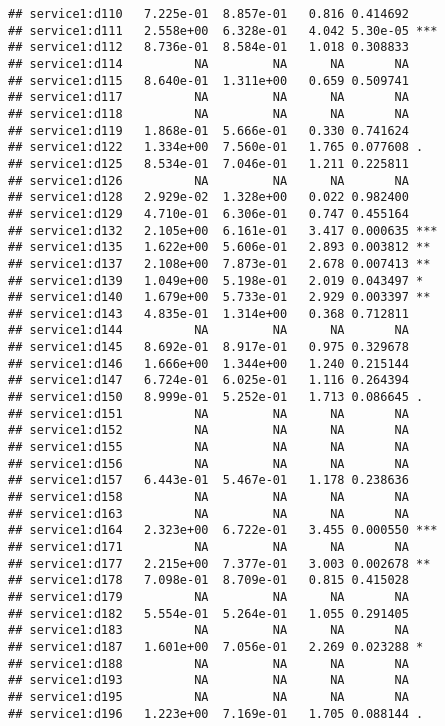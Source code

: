 \documentclass[
]{article}
\begin{document}
\begin{verbatim}
## service1:d110   7.225e-01  8.857e-01   0.816 0.414692    
## service1:d111   2.558e+00  6.328e-01   4.042 5.30e-05 ***
## service1:d112   8.736e-01  8.584e-01   1.018 0.308833    
## service1:d114          NA         NA      NA       NA    
## service1:d115   8.640e-01  1.311e+00   0.659 0.509741    
## service1:d117          NA         NA      NA       NA    
## service1:d118          NA         NA      NA       NA    
## service1:d119   1.868e-01  5.666e-01   0.330 0.741624    
## service1:d122   1.334e+00  7.560e-01   1.765 0.077608 .  
## service1:d125   8.534e-01  7.046e-01   1.211 0.225811    
## service1:d126          NA         NA      NA       NA    
## service1:d128   2.929e-02  1.328e+00   0.022 0.982400    
## service1:d129   4.710e-01  6.306e-01   0.747 0.455164    
## service1:d132   2.105e+00  6.161e-01   3.417 0.000635 ***
## service1:d135   1.622e+00  5.606e-01   2.893 0.003812 ** 
## service1:d137   2.108e+00  7.873e-01   2.678 0.007413 ** 
## service1:d139   1.049e+00  5.198e-01   2.019 0.043497 *  
## service1:d140   1.679e+00  5.733e-01   2.929 0.003397 ** 
## service1:d143   4.835e-01  1.314e+00   0.368 0.712811    
## service1:d144          NA         NA      NA       NA    
## service1:d145   8.692e-01  8.917e-01   0.975 0.329678    
## service1:d146   1.666e+00  1.344e+00   1.240 0.215144    
## service1:d147   6.724e-01  6.025e-01   1.116 0.264394    
## service1:d150   8.999e-01  5.252e-01   1.713 0.086645 .  
## service1:d151          NA         NA      NA       NA    
## service1:d152          NA         NA      NA       NA    
## service1:d155          NA         NA      NA       NA    
## service1:d156          NA         NA      NA       NA    
## service1:d157   6.443e-01  5.467e-01   1.178 0.238636    
## service1:d158          NA         NA      NA       NA    
## service1:d163          NA         NA      NA       NA    
## service1:d164   2.323e+00  6.722e-01   3.455 0.000550 ***
## service1:d171          NA         NA      NA       NA    
## service1:d177   2.215e+00  7.377e-01   3.003 0.002678 ** 
## service1:d178   7.098e-01  8.709e-01   0.815 0.415028    
## service1:d179          NA         NA      NA       NA    
## service1:d182   5.554e-01  5.264e-01   1.055 0.291405    
## service1:d183          NA         NA      NA       NA    
## service1:d187   1.601e+00  7.056e-01   2.269 0.023288 *  
## service1:d188          NA         NA      NA       NA    
## service1:d193          NA         NA      NA       NA    
## service1:d195          NA         NA      NA       NA    
## service1:d196   1.223e+00  7.169e-01   1.705 0.088144 .  

\end{verbatim}
\end{document}
